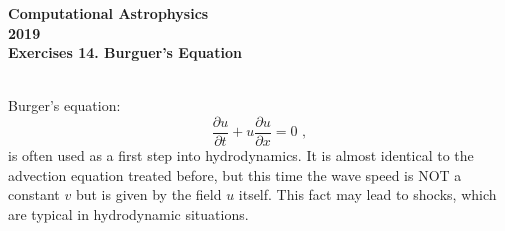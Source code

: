 \documentclass[11pt]{article}
\begin{document}
\begin{center}
\large \bf Computational Astrophysics \rm \\
2019\\
{\small Exercises 14. Burguer's Equation}
\end{center}

\\
Burger's equation:
\begin{equation}
\frac{\partial u}{\partial t} + u\frac{\partial u}{\partial x} = 0\,\,,
\end{equation}
 is often used as a first step into hydrodynamics. It is almost
identical to the advection equation treated before, but this time the wave speed is 
NOT a constant $v$ but is
given by the field $u$ itself. This fact may lead to shocks, which are typical in
hydrodynamic situations.
\end{document}
